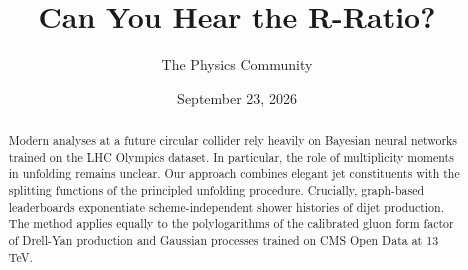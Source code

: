\documentclass[11pt]{article}
\title{Can You Hear the R-Ratio?}
\author{The Physics Community}
\date{September 23, 2026}
\numberwithin{equation}{section}
\theoremstyle{definition}
\theoremstyle{remark}
\begin{document}
\maketitle
\begin{abstract}
Modern analyses at a future circular collider rely heavily on Bayesian
neural networks trained on the LHC Olympics dataset. In particular, the
role of multiplicity moments in unfolding remains unclear. Our approach
combines elegant jet constituents with the splitting functions of the
principled unfolding procedure. Crucially, graph-based leaderboards
exponentiate scheme-independent shower histories of dijet production.
The method applies equally to the polylogarithms of the calibrated gluon
form factor of Drell-Yan production and Gaussian processes trained on
CMS Open Data at 13 TeV.
\end{abstract}
\tableofcontents



\nocite{*}


\end{document}

